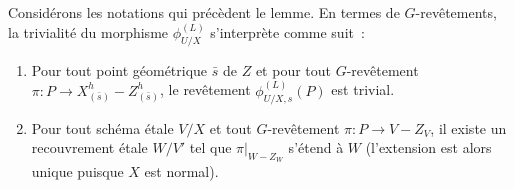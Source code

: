 \documentclass[10pt]{../fichiers-configuration-latex/smfart}
\begin{document}
\begin{remarque} \label{21-rem-principeG}
Considérons les notations qui précèdent le lemme.
En termes de $G$-revêtements, la trivialité du morphisme
$\phi^{(L)}_{U/X}$ s'interprète comme suit~:
\begin{enumerate}
\item[(i)] Pour tout point géométrique $\bar s$ de $Z$
  et pour tout $G$-revêtement 
   $\pi:P \rightarrow X_{(\bar s)}^h-Z_{(\bar s)}^h$,
le revêtement 
$\phi^{(L)}_{U/X,s}(P)$ est trivial.
\item[(ii)] Pour tout schéma étale $V/X$ et tout 
$G$-revêtement $\pi:P \rightarrow V-Z_V$,
 il existe un recouvrement étale $W/V'$ tel que $\pi|_{W-Z_W}$
 s'étend à $W$ (l'extension est alors unique puisque $X$ est normal).
\end{enumerate}
\end{remarque}
\end{document}
